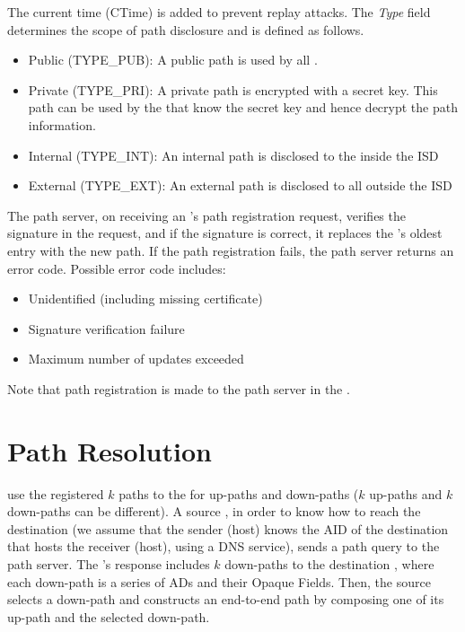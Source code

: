 \noindent The current time (CTime) is added to prevent replay attacks. The {\em Type} field determines the scope of path disclosure and is defined as follows. %
\begin{itemize}
\item {Public (TYPE\_PUB): } A public path is used by all \ADs. %
\item {Private (TYPE\_PRI): } A private path is encrypted with a secret key. This path can be used by the \ADs that know the secret key and hence decrypt the path information. %
\item {Internal (TYPE\_INT): } An internal path is disclosed to the \ADs inside the ISD %
\item {External (TYPE\_EXT): } An external path is disclosed to all \ADs outside the ISD %
\end{itemize}

The \ISDC path server, on receiving an \AD's path registration request, verifies the signature in the request, and if the signature is correct, it replaces the \AD's oldest entry with the new path. If the path registration fails, the path server returns an error code. Possible error code includes:

\begin{itemize}
\item Unidentified \AD (including missing \AD certificate)
\item Signature verification failure
\item Maximum number of updates exceeded
\end{itemize}

Note that path registration is made to the path server in the \ISDC.

\section{Path Resolution} 
\STUB \ADs use the registered $k$ paths to the \ISDC for up-paths and down-paths ($k$ up-paths and $k$ down-paths can be different). A source \AD, in order to know how to reach the destination \AD (we assume that the sender (host) knows the AID of the destination \AD that hosts the receiver (host), using a DNS service), sends a path query to the \ISDC path server. The \ISDC \PS's response includes $k$ down-paths to the destination \AD, where each down-path is a series of ADs and their Opaque Fields. Then, the source \AD selects a down-path and constructs an end-to-end path by composing one of its up-path and the selected down-path.

